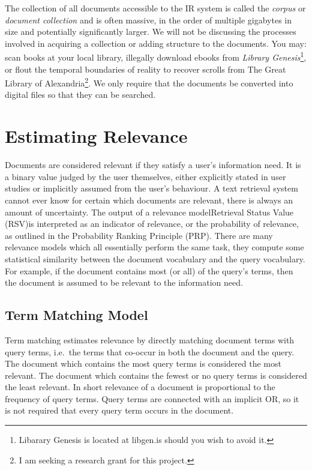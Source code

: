 The collection of all documents accessible to the IR system is called the \textit{corpus} or \textit{document collection} and is often massive, in the order of multiple gigabytes in size and potentially significantly larger. We will not be discussing the processes involved in acquiring a collection or adding structure to the documents. You may: scan books at your local library, illegally download ebooks from \textit{Library Genesis}\footnote{Libarary Genesis is located at libgen.is should you wish to avoid it.}, or flout the temporal boundaries of reality to recover scrolls from The Great Library of Alexandria\footnote{I am seeking a research grant for this project.}. We only require that the documents be converted into digital files so that they can be searched.

\section{Estimating Relevance}
Documents are considered relevant if they satisfy a user's information need. It is a binary value judged by the user themselves, either explicitly stated in user studies or implicitly assumed from the user's behaviour. A text retrieval system cannot ever know for certain which documents are relevant, there is always an amount of uncertainty. The output of a relevance model\textemdash Retrieval Status Value (RSV)\textemdash is interpreted as an indicator of relevance, or the probability of relevance, as outlined in the Probability Ranking Principle \cite{jones2000probabilistic} (PRP). There are many relevance models which all essentially perform the same task, they compute some statistical similarity between the document vocabulary and the query vocabulary. For example, if the document contains most (or all) of the query's terms, then the document is assumed to be relevant to the information need. 




\subsection{Term Matching Model}
Term matching estimates relevance by directly matching document terms with query terms, i.e.\ the terms that co-occur in both the document and the query. The document which contains the most query terms is considered the most relevant. The document which contains the fewest or no query terms is considered the least relevant. In short relevance of a document is proportional to the frequency of query terms. Query terms are connected with an implicit OR, so it is not required that every query term occurs in the document. 


